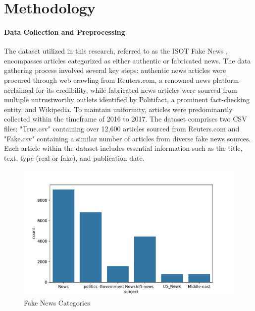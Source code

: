 \chapter{Methodology}
\label{ch:method} %

\subsubsection{{Data Collection and Preprocessing}}

The dataset utilized in this research, referred to as the ISOT Fake News \cite{fake-news}, encompasses articles categorized as either authentic or fabricated news. The data gathering process involved several key steps: authentic news articles were procured through web crawling from Reuters.com, a renowned news platform acclaimed for its credibility, while fabricated news articles were sourced from multiple untrustworthy outlets identified by Politifact, a prominent fact-checking entity, and Wikipedia. To maintain uniformity, articles were predominantly collected within the timeframe of 2016 to 2017. The dataset comprises two CSV files: "True.csv" containing over 12,600 articles sourced from Reuters.com and "Fake.csv" containing a similar number of articles from diverse fake news sources. Each article within the dataset includes essential information such as the title, text, type (real or fake), and publication date. 

 \begin{figure}

     \centering
     \includegraphics[width=1\linewidth]{figures/FakeNewCategories.pdf}
     \caption{Fake News Categories}
     \label{fig:enter-label}
 \end{figure}

